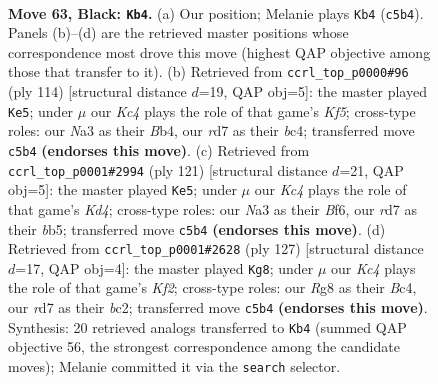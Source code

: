 \documentclass[11pt]{article}
\begin{document}
\clearpage

\begin{figure}[p]\centering
\begin{subfigure}{0.46\textwidth}\centering
\resizebox{\linewidth}{!}{%
\newchessgame
\chessboard[
  setfen={6r1/3R4/Pp6/2k2p2/B4P2/n2K4/8/8 b - - 10 63},
  showmover=false,
  pgfstyle=straightmove, color=movearrow, markmove={c5-b4}
]}
\caption{}
\end{subfigure}\hfill
\begin{subfigure}{0.46\textwidth}\centering
\resizebox{\linewidth}{!}{%
\newchessgame
\chessboard[
  setfen={1R6/5k2/2r5/5K2/1Bb1P3/1p6/1P6/8 w - - 24 58},
  showmover=false,
  pgfstyle=straightmove, color=movearrow, markmove={f5-e5}
]}
\caption{}
\end{subfigure}
\\[4pt]
\begin{subfigure}{0.46\textwidth}\centering
\resizebox{\linewidth}{!}{%
\newchessgame
\chessboard[
  setfen={8/8/4pb1p/1B1k3P/6P1/1P1K4/8/8 b - - 14 61},
  showmover=false,
  pgfstyle=straightmove, color=movearrow, markmove={d5-e5}
]}
\caption{}
\end{subfigure}\hfill
\begin{subfigure}{0.46\textwidth}\centering
\resizebox{\linewidth}{!}{%
\newchessgame
\chessboard[
  setfen={8/5kp1/7p/2Bn1K2/2b4P/8/2B3P1/8 b - - 10 64},
  showmover=false,
  pgfstyle=straightmove, color=movearrow, markmove={f7-g8}
]}
\caption{}
\end{subfigure}
\caption{\textbf{Move 63, Black: \texttt{Kb4}.} (a) Our position; Melanie plays \texttt{Kb4} (\texttt{c5b4}). Panels (b)--(d) are the retrieved master positions whose correspondence most drove this move (highest QAP objective among those that transfer to it). (b) Retrieved from \texttt{ccrl\_top\_p0000\#96} (ply 114) [structural distance $d$=19, QAP obj=5]: the master played \texttt{Ke5}; under $\mu$ our \emph{Kc4} plays the role of that game's \emph{Kf5}; cross-type roles: our \emph{N}a3 as their \emph{B}b4, our \emph{r}d7 as their \emph{b}c4; transferred move \texttt{c5b4} \textbf{(endorses this move)}. (c) Retrieved from \texttt{ccrl\_top\_p0001\#2994} (ply 121) [structural distance $d$=21, QAP obj=5]: the master played \texttt{Ke5}; under $\mu$ our \emph{Kc4} plays the role of that game's \emph{Kd4}; cross-type roles: our \emph{N}a3 as their \emph{B}f6, our \emph{r}d7 as their \emph{b}b5; transferred move \texttt{c5b4} \textbf{(endorses this move)}. (d) Retrieved from \texttt{ccrl\_top\_p0001\#2628} (ply 127) [structural distance $d$=17, QAP obj=4]: the master played \texttt{Kg8}; under $\mu$ our \emph{Kc4} plays the role of that game's \emph{Kf2}; cross-type roles: our \emph{R}g8 as their \emph{B}c4, our \emph{r}d7 as their \emph{b}c2; transferred move \texttt{c5b4} \textbf{(endorses this move)}. Synthesis: 20 retrieved analogs transferred to \texttt{Kb4} (summed QAP objective 56, the strongest correspondence among the candidate moves); Melanie committed it via the \texttt{search} selector.}
\label{fig:thought-m125}
\end{figure}
\end{document}
